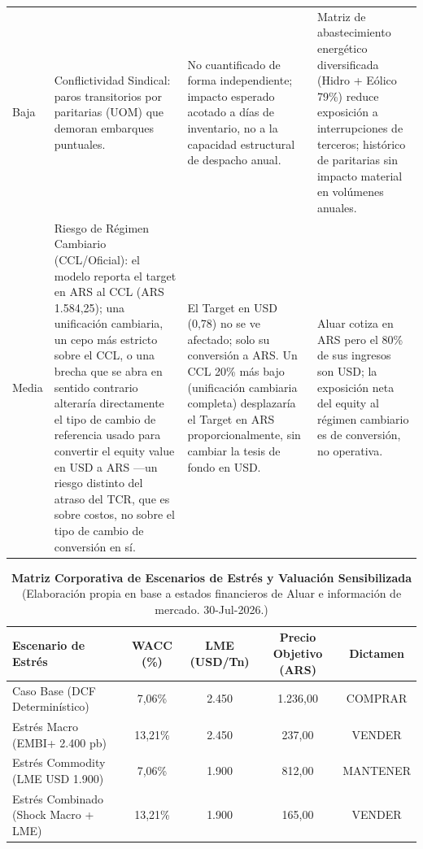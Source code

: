 \documentclass[10pt,a4paper]{article}
\begin{document}
\begin{table}[H]
\begin{tabular}{p{1.1cm}p{3.3cm}p{4.7cm}p{4.7cm}}
Baja & Conflictividad Sindical: paros transitorios por paritarias (UOM) que demoran embarques puntuales. & No cuantificado de forma independiente; impacto esperado acotado a días de inventario, no a la capacidad estructural de despacho anual. & Matriz de abastecimiento energético diversificada (Hidro + Eólico 79\%) reduce exposición a interrupciones de terceros; histórico de paritarias sin impacto material en volúmenes anuales. \\
Media & Riesgo de Régimen Cambiario (CCL/Oficial): el modelo reporta el target en ARS al CCL (ARS 1.584,25); una unificación cambiaria, un cepo más estricto sobre el CCL, o una brecha que se abra en sentido contrario alteraría directamente el tipo de cambio de referencia usado para convertir el equity value en USD a ARS —un riesgo distinto del atraso del TCR, que es sobre costos, no sobre el tipo de cambio de conversión en sí. & El Target en USD (0,78) no se ve afectado; solo su conversión a ARS. Un CCL 20\% más bajo (unificación cambiaria completa) desplazaría el Target en ARS proporcionalmente, sin cambiar la tesis de fondo en USD. & Aluar cotiza en ARS pero el 80\% de sus ingresos son USD; la exposición neta del equity al régimen cambiario es de conversión, no operativa. \\
\bottomrule
\end{tabular}
\end{table}

\begin{table}[H]
\centering
\caption{\textbf{Matriz Corporativa de Escenarios de Estrés y Valuación Sensibilizada} {\small\color{gsgray} (Elaboración propia en base a estados financieros de Aluar e información de mercado. 30-Jul-2026.)}}
\small
\begin{tabular}{lcccc}
\toprule
\textbf{Escenario de Estrés} & \textbf{WACC (\%)} & \textbf{LME (USD/Tn)} & \textbf{Precio Objetivo (ARS)} & \textbf{Dictamen} \\
\midrule
Caso Base (DCF Determinístico) & 7,06\% & 2.450 & 1.236,00 & COMPRAR \\
Estrés Macro (EMBI+ 2.400 pb) & 13,21\% & 2.450 & 237,00 & VENDER \\
Estrés Commodity (LME USD 1.900) & 7,06\% & 1.900 & 812,00 & MANTENER \\
Estrés Combinado (Shock Macro + LME) & 13,21\% & 1.900 & 165,00 & VENDER \\
\bottomrule
\end{tabular}
\end{table}
\end{document}

